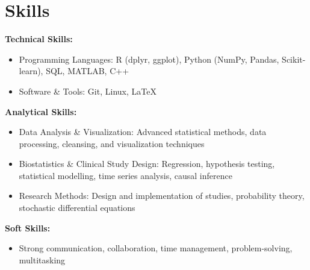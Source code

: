 \section{Skills}
\textbf{Technical Skills:}
\begin{itemize}[leftmargin=*]
    \item Programming Languages: R (dplyr, ggplot), Python (NumPy, Pandas, Scikit-learn), SQL, MATLAB, C++
    \item Software \& Tools: Git, Linux, \LaTeX
\end{itemize}
\textbf{Analytical Skills:}
\begin{itemize}[leftmargin=*]
    \item Data Analysis \& Visualization: Advanced statistical methods, data processing, cleansing, and visualization techniques
    \item Biostatistics \& Clinical Study Design: Regression, hypothesis testing, statistical modelling, time series analysis, causal inference
    \item Research Methods: Design and implementation of studies, probability theory, stochastic differential equations
\end{itemize}
\textbf{Soft Skills:}
\begin{itemize}[leftmargin=*]
    \item Strong communication, collaboration, time management, problem-solving, multitasking
\end{itemize}
